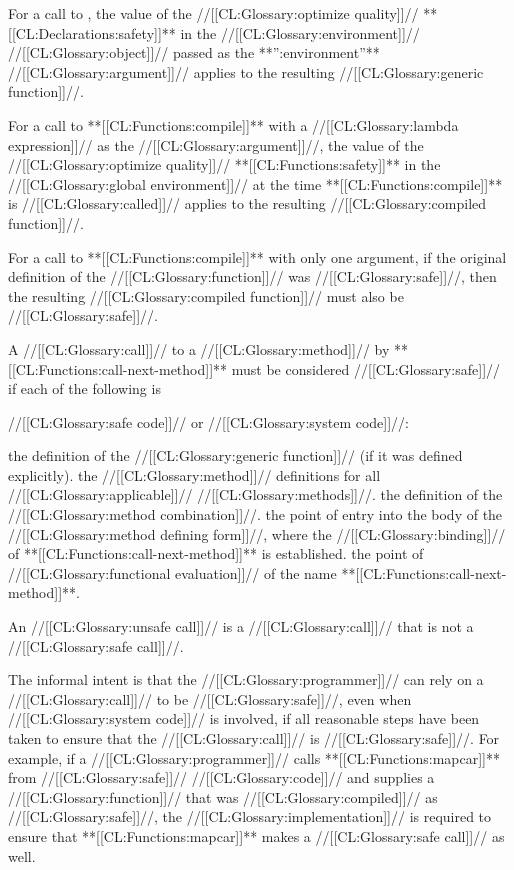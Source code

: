    
\itemitem{\bull}
For a call to , the value of the
//[[CL:Glossary:optimize quality]]// **[[CL:Declarations:safety]]** in the //[[CL:Glossary:environment]]//
//[[CL:Glossary:object]]// passed as the **'':environment''** //[[CL:Glossary:argument]]// applies 
to the resulting //[[CL:Glossary:generic function]]//.

\itemitem{\bull}
For a call to **[[CL:Functions:compile]]** with a //[[CL:Glossary:lambda expression]]// as the
//[[CL:Glossary:argument]]//, the value of the //[[CL:Glossary:optimize quality]]// **[[CL:Functions:safety]]**
in the //[[CL:Glossary:global environment]]// at the time **[[CL:Functions:compile]]** is //[[CL:Glossary:called]]//
applies to the resulting //[[CL:Glossary:compiled function]]//.

\itemitem{\bull}
For a call to **[[CL:Functions:compile]]** with only one argument, if the original definition
of the //[[CL:Glossary:function]]// was //[[CL:Glossary:safe]]//, then the resulting //[[CL:Glossary:compiled function]]//
must also be //[[CL:Glossary:safe]]//.

\itemitem{\bull}
A //[[CL:Glossary:call]]// to a //[[CL:Glossary:method]]// by **[[CL:Functions:call-next-method]]** must be 
considered //[[CL:Glossary:safe]]// if each of the following is 

//[[CL:Glossary:safe code]]// or //[[CL:Glossary:system code]]//:


\beginlist





\itemitem{--} the definition of the //[[CL:Glossary:generic function]]// (if it was defined explicitly).
\itemitem{--} the //[[CL:Glossary:method]]// definitions for all //[[CL:Glossary:applicable]]// //[[CL:Glossary:methods]]//.
\itemitem{--} the definition of the //[[CL:Glossary:method combination]]//.
\itemitem{--} the point of entry into the body of the //[[CL:Glossary:method defining form]]//,
	      where the //[[CL:Glossary:binding]]// of **[[CL:Functions:call-next-method]]** is established.
\itemitem{--} the point of //[[CL:Glossary:functional evaluation]]// of the name **[[CL:Functions:call-next-method]]**.
\endlist

\endlist

An //[[CL:Glossary:unsafe call]]// is a //[[CL:Glossary:call]]// that is not a //[[CL:Glossary:safe call]]//.

The informal intent is that the //[[CL:Glossary:programmer]]// can rely on a //[[CL:Glossary:call]]//
to be //[[CL:Glossary:safe]]//, even when //[[CL:Glossary:system code]]// is involved, if all reasonable
steps have been taken to ensure that the //[[CL:Glossary:call]]// is //[[CL:Glossary:safe]]//.
For example, if a //[[CL:Glossary:programmer]]// calls **[[CL:Functions:mapcar]]** from //[[CL:Glossary:safe]]//
//[[CL:Glossary:code]]// and supplies a //[[CL:Glossary:function]]// that was //[[CL:Glossary:compiled]]// 
as //[[CL:Glossary:safe]]//, the //[[CL:Glossary:implementation]]// is required to ensure that
**[[CL:Functions:mapcar]]** makes a //[[CL:Glossary:safe call]]// as well.

